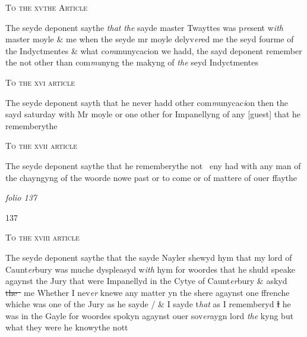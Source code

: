 \documentclass[12pt, a4paper]{book}
\begin{document}
 		
				\begin{center}  {\scshape To the xvthe Article}  \end{center}
			
 	
		\ifthenelse{\isodd{\thepage}}
		{\reversemarginpar}
		{\normalmarginpar}
		The seyde deponent saythe \textit{that}
 		\textit{the} sayde master Twayttes was p\textit{re}sent w\textit{ith} master moyle \& me when the seyde mr moyle delyv\textit{er}ed me the seyd fourme of the 
			Indyctmentes \& what co\textit{m}munycacion we hadd, the sayd deponent remember the not other than com\textit{mu}nyng the makyng of \textit{the} seyd Indyctmentes
 	
				\begin{center}  {\scshape To the xvi article}  \end{center}
			
 	
		\ifthenelse{\isodd{\thepage}}
		{\reversemarginpar}
		{\normalmarginpar}
		The seyde deponent sayth that he never hadd other com\textit{m}unycac\textit{i}on then the sayd saturday with Mr moyle or one other for Impanellyng of  any [guest] that he rememberythe 
 	
				\begin{center}  {\scshape To the xvii article}  \end{center}
			
 	
		\ifthenelse{\isodd{\thepage}}
		{\reversemarginpar}
		{\normalmarginpar}
		The seyde deponent saythe that he rememberythe not  
			eny had with any man of the chayngyng of the woorde nowe past or to come or of mattere of ouer ffaythe

\dotfill
						\newpage
{}

\textit{folio 137}


\begin{flushright}{\color{Mahogany}137}\end{flushright}
 	
 		
				\begin{center}  {\scshape To the xviii article}  \end{center}
			
 		
		\ifthenelse{\isodd{\thepage}}
		{\reversemarginpar}
		{\normalmarginpar}
		The seyde deponent saythe that the sayde Nayler shewyd  hym that my lord of Caunt\textit{er}bury was muche dyspleasyd w\textit{ith} hym for woordes that he shuld speake agaynst the Jury that were Impanellyd in the Cytye of Caunt\textit{er}bury \& askyd  \sout{the } me Whether I nev\textit{er} knewe any matter yn the shere agaynst one ffrenche whiche was one of the Jury as he sayde
			 / \& I sayde t\textit{hat} as I rememberyd \sout{I } he was in the Gayle for woordes spokyn agaynst ouer sov\textit{er}aygn lord \textit{the} kyng but what they were he knowythe nott
 	
\end{document}
